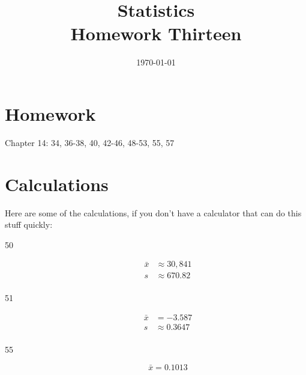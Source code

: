 \documentclass[letterpaper, landscape]{exam}
\title{Statistics \\ Homework Thirteen}
\date{\today}
\author{}
\begin{document}
  \maketitle

  \section{Homework}
  Chapter 14: 34, 36-38, 40, 42-46, 48-53, 55, 57

  \ifprintanswers
  \else
    \section{Calculations}
    Here are some of the calculations, if you don't have a calculator that can do
    this stuff quickly:

    \begin{description}
      \item[50]
        \begin{align*}
          \bar{x} & \approx 30,841 \\
          s       & \approx 670.82 \\
        \end{align*}

      \item[51]
        \begin{align*}
          \bar{x} & = -3.587 \\
          s       & \approx 0.3647 \\
        \end{align*}

      \item[55] 
        \[
          \bar{x} = 0.1013
        \]

    \end{description}
  \fi

  \ifprintanswers
\end{document}
